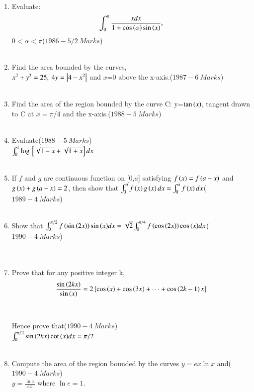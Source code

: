 \documentclass[journal,12pt,twocolumn]{IEEEtran}
\theoremstyle{remark}
\begin{document}
\begin{enumerate}
		     \item Evaluate:\begin{align*}
		         \int_{0}^{\pi}\frac{xdx}{1+\cos{\ensuremath{\left(\alpha\right)}}\sin{\ensuremath{\left(x\right)}}},
			 \end{align*}$0<\alpha<\pi$\hfill($1986-5/2\ Marks$)\\\\
			 \item Find the area bounded by the curves,\\ $x^2+y^2=25,\ 4y=\left\vert4-x^2\right\vert$ and $x$=0 above the x-axis.\hfill($1987-6\ Marks$)\\\\
			 \item Find the area of the region bounded by the curve C: y=$\tan{\ensuremath{\left(x\right)}}$, tangent drawn to C at $x=\pi/4$ and the x-axis.\hfill($1988-5\ Marks$)\\\\
			 \item Evaluate\hfill($1988-5\ Marks$)\\$\int_{0}^{1}\log{}\left[\sqrt{1-x}+\sqrt{1+x}\right]dx$\\\\
			 \item If $f$ and $g$ are continuous function on [0,$a$] satisfying $f\left(x\right)=f\left(a-x\right)$ and\\$g\left(x\right)+g\left(a-x\right)=2$, then show that $\int_{0}^{a}f\left(x\right)g\left(x\right)dx = \int_{0}^{a}f\left(x\right)dx$\hfill($1989-4\ Marks$)\\\\
			 \item Show that $\int_{0}^{\pi/2}f\left(\sin{\ensuremath{\left(2x\right)}}\right)\sin{\ensuremath{\left(x\right)}}dx=\sqrt{2}\int_{0}^{\pi/4}f\left(\cos{\ensuremath{\left(2x\right)}}\right)\cos{\ensuremath{\left(x\right)}}dx$\hfill($1990-4\ Marks$)\\\\\\
			 \item Prove that for any positive integer k,
				 \begin{align*} \frac{\sin{\ensuremath{\left(2kx\right)}}}{\sin{\ensuremath{\left(x\right)}}}=2{}\left[\cos{\ensuremath{\left(x\right)}}+\cos{\ensuremath{\left(3x\right)}}+\cdots+\cos{\ensuremath{\left(2k-1\right)}x}\right]
				 \end{align*}
					 \\\\Hence prove that\hfill($1990-4\ Marks$)\\ $\int_{0}^{\pi/2}\sin{\ensuremath{\left(2kx\right)}}\cot{\ensuremath{\left(x\right)}}dx=\pi/2$\\\\
			 \item Compute the area of the region bounded by the curves $y=ex\ln{x}$ and\hfill($1990-4\ Marks$)\\$y=\frac{\ln{x}}{ex}$ where $\ln{e}=1$.\\\\
			 \end{enumerate}
			 
\end{document}
